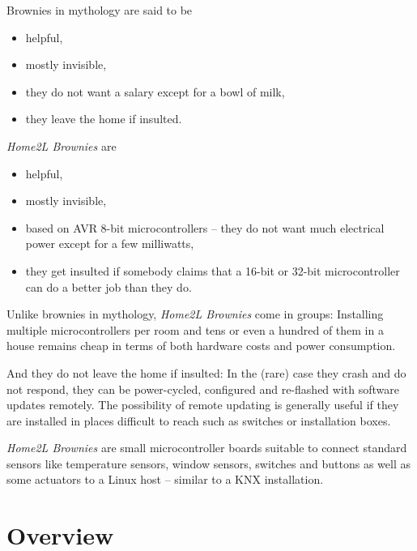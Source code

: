 \documentclass[12pt,english,parskip=half,headheight=19pt]{scrreprt}
\begin{document}
Brownies in mythology are said to be
\begin{itemize}
  \item helpful,
  \item mostly invisible,
  \item they do not want a salary except for a bowl of milk,
  \item they leave the home if insulted.
\end{itemize}



\textit{Home2L Brownies} are
\begin{itemize}
  \item helpful,
  \item mostly invisible,
  \item based on AVR 8-bit microcontrollers -- they do not want much electrical power except for a few milliwatts,
  \item they get insulted if somebody claims that a 16-bit or 32-bit microcontroller can do
        a better job than they do.
\end{itemize}
Unlike brownies in mythology, \textit{Home2L Brownies} come in groups:
Installing multiple microcontrollers per room and tens or even a hundred of them in a house remains cheap in terms of both hardware costs and power consumption.

And they do not leave the home if insulted: In the (rare) case they crash and do not respond, they can be power-cycled, configured and re-flashed with software updates remotely. The possibility of remote updating is generally useful if they are installed in places difficult to reach such as switches or installation boxes.

\textit{Home2L Brownies} are small microcontroller boards suitable to connect standard sensors like temperature sensors, window sensors, switches and buttons as well as some actuators to a Linux host -- similar to a KNX installation.





\section{Overview}
\label{sec:brownies-overview}
\end{document}
